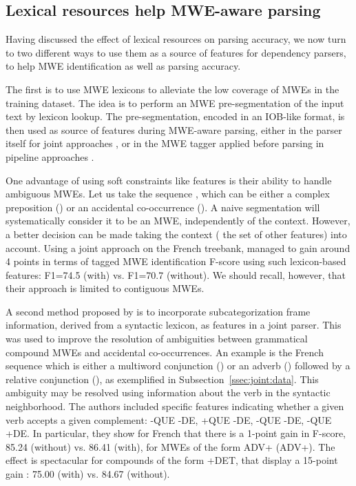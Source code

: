 \documentclass[output=paper]{LSP/langsci}
\begin{document}
\subsection{Lexical resources help MWE-aware parsing}
\label{ssec:lex-help-mwe}

Having discussed the effect of lexical resources on parsing accuracy, we now turn to two different ways to use them as a source of features for dependency parsers, to help MWE identification as well as parsing accuracy. 

The first is to use MWE lexicons to alleviate the low coverage of MWEs in the training dataset. The idea is to perform an MWE pre-segmentation of the input text by lexicon lookup. The pre-segmentation, encoded in an IOB-like format, is then used as source of features during MWE-aware parsing, either in the parser itself for joint approaches \citep{candito2014strategies}, or in the MWE tagger applied before parsing in pipeline approaches \citep{constant12,constant:13:mwe}.  

One advantage of using soft constraints like features is their ability to handle ambiguous MWEs.
Let us take the sequence , which can be either a complex preposition () or an accidental co-occurrence (). A naive segmentation will systematically consider it to be an MWE, independently of the context. However, a better decision can be made taking the context (\ie{} the set of other features) into account. Using a joint approach on the French treebank, \citet{candito2014strategies} managed to gain around 4 points in terms of tagged MWE identification F-score using such lexicon-based features: F1=74.5 (with) vs. F1=70.7 (without). We should recall, however, that their approach is limited to contiguous MWEs.


A second method proposed by \citet{nasretal15} is to incorporate subcategorization frame information, derived from a syntactic lexicon, as features in a joint parser. This was used to improve the resolution of ambiguities between grammatical compound MWEs and accidental co-occurrences.
An example is the French sequence  which is either a multiword conjunction () or  an adverb () followed by a relative conjunction (), as exemplified in Subsection~\ref{ssec:joint:data}. This ambiguity may be resolved using information about the verb in the syntactic neighborhood. The authors included specific features indicating whether a given verb accepts a given complement:  -QUE -DE,  +QUE -DE,  -QUE -DE,  -QUE +DE. 
In particular, they show for French that there is a 1-point gain in F-score, 85.24 (without) vs. 86.41 (with), for MWEs of the form ADV+ (ADV+). The effect is spectacular for compounds of the form +DET, that display a 15-point gain : 75.00 (with) vs. 84.67 (without).
\end{document}
